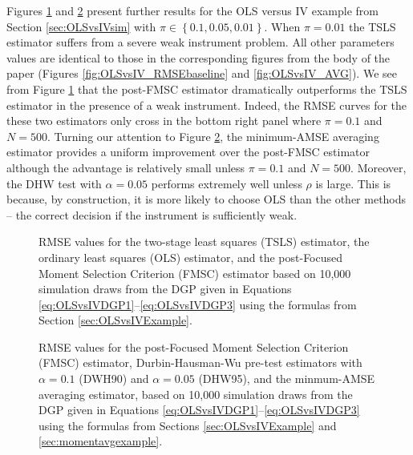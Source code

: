Figures \ref{fig:OLSvsIV_RMSEbaseline_weak} and \ref{fig:OLSvsIV_AVG_weak} present further results for the OLS versus IV example from Section \ref{sec:OLSvsIVsim} with $\pi \in \left\{0.1, 0.05, 0.01\right\}$.
When $\pi = 0.01$ the TSLS estimator suffers from a severe weak instrument problem.
All other parameters values are identical to those in the corresponding figures from the body of the paper (Figures \ref{fig:OLSvsIV_RMSEbaseline} and \ref{fig:OLSvsIV_AVG}).
We see from Figure \ref{fig:OLSvsIV_RMSEbaseline_weak} that the post-FMSC estimator dramatically outperforms the TSLS estimator in the presence of a weak instrument.
Indeed, the RMSE curves for the these two estimators only cross in the bottom right panel where $\pi = 0.1$ and $N = 500$. 
Turning our attention to Figure \ref{fig:OLSvsIV_AVG_weak}, the minimum-AMSE averaging estimator provides a uniform improvement over the post-FMSC estimator although the advantage is relatively small unless $\pi = 0.1$ and $N=500$. 
Moreover, the DHW test with $\alpha = 0.05$ performs extremely well unless $\rho$ is large.
This is because, by construction, it is more likely to choose OLS than the other methods -- the correct decision if the instrument is sufficiently weak.


\begin{figure}[h]
\centering
	
	\caption{RMSE values for the two-stage least squares (TSLS) estimator, the ordinary least squares (OLS) estimator, and the post-Focused Moment Selection Criterion (FMSC) estimator based on 10,000 simulation draws from the DGP given in Equations \ref{eq:OLSvsIVDGP1}--\ref{eq:OLSvsIVDGP3} using the formulas from Section \ref{sec:OLSvsIVExample}.}
	\label{fig:OLSvsIV_RMSEbaseline_weak}
\end{figure}

\begin{figure}[h]
\centering
	
	\caption{RMSE values for the post-Focused Moment Selection Criterion (FMSC) estimator, Durbin-Hausman-Wu pre-test estimators with $\alpha = 0.1$ (DWH90) and $\alpha = 0.05$ (DHW95), and the minmum-AMSE averaging estimator, based on 10,000 simulation draws from the DGP given in Equations \ref{eq:OLSvsIVDGP1}--\ref{eq:OLSvsIVDGP3} using the formulas from Sections \ref{sec:OLSvsIVExample} and \ref{sec:momentavgexample}.}
	\label{fig:OLSvsIV_AVG_weak}
\end{figure}

